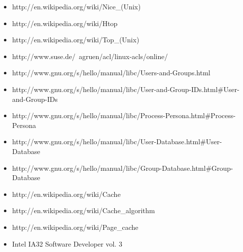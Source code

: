 \documentclass[a4paper,10pt]{article}
\begin{document}
\begin{itemize}
  \item http://en.wikipedia.org/wiki/Nice\_(Unix)
  \item http://en.wikipedia.org/wiki/Htop
  \item http://en.wikipedia.org/wiki/Top\_(Unix)
  \item http://www.suse.de/~agruen/acl/linux-acls/online/
  \item http://www.gnu.org/s/hello/manual/libc/Users-and-Groups.html
  \item http://www.gnu.org/s/hello/manual/libc/User-and-Group-IDs.html\#User-and-Group-IDs
  \item http://www.gnu.org/s/hello/manual/libc/Process-Persona.html\#Process-Persona
  \item http://www.gnu.org/s/hello/manual/libc/User-Database.html\#User-Database
  \item http://www.gnu.org/s/hello/manual/libc/Group-Database.html\#Group-Database
  \item http://en.wikipedia.org/wiki/Cache
  \item http://en.wikipedia.org/wiki/Cache\_algorithm
  \item http://en.wikipedia.org/wiki/Page\_cache 
  \item Intel IA32 Software Developer vol. 3
\end{itemize}
   
\end{document}
